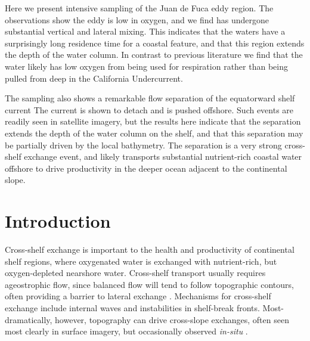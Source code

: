 \documentclass[draft]{agujournal2019}
\begin{document}
Here we present intensive sampling of the Juan de Fuca eddy region. The observations show the eddy is low in oxygen, and we find has undergone substantial vertical and lateral mixing. This indicates that the waters have a surprisingly long residence time for a coastal feature, and that this region extends the depth of the water column.  In contrast to previous literature we find that the water likely has low oxygen from being used for respiration rather than being pulled from deep in the California Undercurrent.

The sampling also shows a remarkable flow separation of the equatorward shelf current  The current is shown to detach and is pushed offshore. Such events are readily seen in satellite imagery, but the results here indicate that the separation extends the depth of the water column on the shelf, and that this separation may be partially driven by the local bathymetry.  The separation is a very strong cross-shelf exchange event, and likely transports substantial nutrient-rich coastal water offshore to drive productivity in the deeper ocean adjacent to the continental slope.

%
%


\section{Introduction}

Cross-shelf exchange is important to the health and productivity of continental shelf regions, where oxygenated water is exchanged with nutrient-rich, but oxygen-depleted nearshore water.  Cross-shelf transport usually requires ageostrophic flow, since balanced flow will tend to follow topographic contours, often providing a barrier to lateral exchange \cite{brink16}.  Mechanisms for cross-shelf exchange include internal waves and instabilities in shelf-break fronts.  Most-dramatically, however, topography can drive cross-slope exchanges, often seen most clearly in surface imagery, but occasionally observed \emph{in-situ} \cite{barthetal00}.
\end{document}
